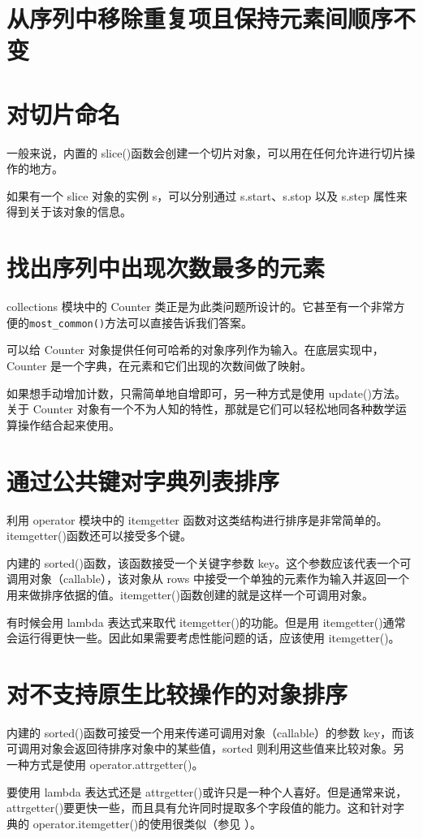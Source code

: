 \section{从序列中移除重复项且保持元素间顺序不变}
\section{对切片命名}
一般来说，内置的 slice()函数会创建一个切片对象，可以用在任何允许进行切片操作的地方。

如果有一个 slice 对象的实例 s，可以分别通过 s.start、s.stop 以及 s.step 属性来得到关于该对象的信息。
\section{找出序列中出现次数最多的元素}
collections 模块中的 Counter 类正是为此类问题所设计的。它甚至有一个非常方便的\verb|most_common()|方法可以直接告诉我们答案。

可以给 Counter 对象提供任何可哈希的对象序列作为输入。在底层实现中，Counter 是一个字典，在元素和它们出现的次数间做了映射。

如果想手动增加计数，只需简单地自增即可，另一种方式是使用 update()方法。关于 Counter 对象有一个不为人知的特性，那就是它们可以轻松地同各种数学运算操作结合起来使用。

\section{通过公共键对字典列表排序\label{sec1.13}}
利用 operator 模块中的 itemgetter 函数对这类结构进行排序是非常简单的。itemgetter()函数还可以接受多个键。

内建的 sorted()函数，该函数接受一个关键字参数 key。这个参数应该代表一个可调用对象（callable），该对象从 rows 中接受一个单独的元素作为输入并返回一个用来做排序依据的值。itemgetter()函数创建的就是这样一个可调用对象。

有时候会用 lambda 表达式来取代 itemgetter()的功能。但是用 itemgetter()通常会运行得更快一些。因此如果需要考虑性能问题的话，应该使用 itemgetter()。
\section{对不支持原生比较操作的对象排序}
内建的 sorted()函数可接受一个用来传递可调用对象（callable）的参数 key，而该可调用对象会返回待排序对象中的某些值，sorted 则利用这些值来比较对象。另一种方式是使用 operator.attrgetter()。

要使用 lambda 表达式还是 attrgetter()或许只是一种个人喜好。但是通常来说，attrgetter()要更快一些，而且具有允许同时提取多个字段值的能力。这和针对字典的 operator.itemgetter()的使用很类似（参见 ）。
